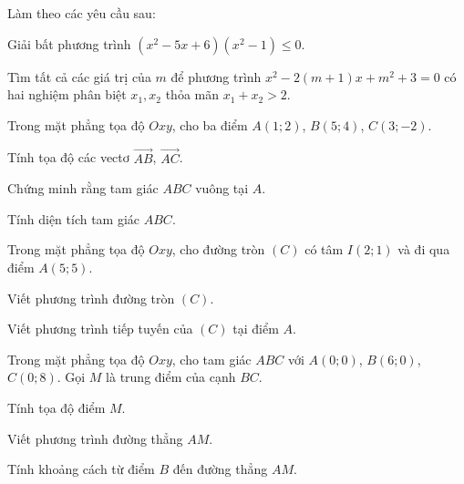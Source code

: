 
\NQuestion Làm theo các yêu cầu sau:
\begin{SubQuestions}
\item Giải bất phương trình $\left(x^2-5x+6\right)\left(x^2-1\right)\le 0$.
\item Tìm tất cả các giá trị của \(m\) để phương trình $x^2-2(m+1)x+m^2+3=0$ có hai nghiệm phân biệt \(x_1,x_2\) thỏa mãn $x_1+x_2>2$.
\end{SubQuestions}

\NQuestion Trong mặt phẳng tọa độ \(Oxy\), cho ba điểm $A(1;2)$, $B(5;4)$, $C(3;-2)$.
\begin{SubQuestions}
\item Tính tọa độ các vectơ \(\overrightarrow{AB}\), \(\overrightarrow{AC}\).
\item Chứng minh rằng tam giác \(ABC\) vuông tại \(A\).
\item Tính diện tích tam giác \(ABC\).
\end{SubQuestions}

\NQuestion Trong mặt phẳng tọa độ \(Oxy\), cho đường tròn \((C)\) có tâm \(I(2;1)\) và đi qua điểm \(A(5;5)\).
\begin{SubQuestions}
\item Viết phương trình đường tròn \((C)\).
\item Viết phương trình tiếp tuyến của \((C)\) tại điểm \(A\).
\end{SubQuestions}

\NQuestion Trong mặt phẳng tọa độ \(Oxy\), cho tam giác \(ABC\) với $A(0;0)$, $B(6;0)$, $C(0;8)$.
Gọi \(M\) là trung điểm của cạnh \(BC\).
\begin{SubQuestions}
\item Tính tọa độ điểm \(M\).
\item Viết phương trình đường thẳng \(AM\).
\item Tính khoảng cách từ điểm \(B\) đến đường thẳng \(AM\).
\end{SubQuestions}
